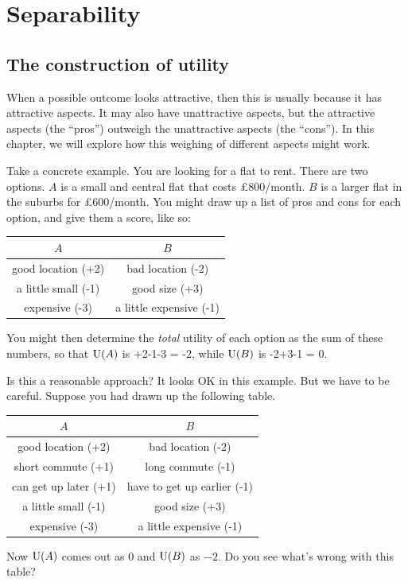 \chapter{Separability}\label{ch:separability}

\section{The construction of utility}\label{sec:construction-value}

When a possible outcome looks attractive, then this is usually because it has
attractive aspects. It may also have unattractive aspects, but the attractive
aspects (the ``pros'') outweigh the unattractive aspects (the ``cons''). In this
chapter, we will explore how this weighing of different aspects might work.

Take a concrete example. You are looking for a flat to rent. There are two
options. $A$ is a small and central flat that costs £800/month. $B$ is a larger
flat in the suburbs for £600/month. You might draw up a list of pros and cons
for each option, and give them a score, like so:

\medskip
\begin{center}
  \def\arraystretch{1} %
  \begin{tabular}{|c|c|}
    \rowcolor{gray!20}
    $A$                & $B$ \\\hline
    good location (+2) & bad location (-2) \\
    a little small (-1) & good size (+3) \\
    expensive (-3) & a little expensive (-1) \\\hline 
  \end{tabular}
\end{center}
\medskip\noindent%
You might then determine the \emph{total} utility of each option as the sum of
these numbers, so that $\text{U}(A)$ is +2-1-3 = -2, while $\text{U}(B)$ is -2+3-1 = 0.

Is this a reasonable approach? It looks OK in this example. But we have to be
careful. Suppose you had drawn up the following table.
\medskip
\begin{center}
  \def\arraystretch{1} %
  \begin{tabular}{|c|c|}
    \rowcolor{gray!20}
    $A$                & $B$ \\\hline
    good location (+2) & bad location (-2) \\
    short commute (+1) & long commute (-1) \\
    can get up later (+1) & have to get up earlier (-1) \\
    a little small (-1) & good size (+3) \\
    expensive (-3) & a little expensive (-1) \\\hline 
  \end{tabular}
\end{center}
\medskip\noindent%
Now $\text{U}(A)$ comes out as $0$ and $\text{U}(B)$ as $-2$. Do you see what's wrong with
this table?


